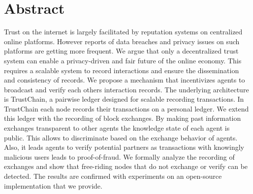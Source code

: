 \chapter*{Abstract}

Trust on the internet is largely facilitated by reputation systems on centralized online platforms. 
However reports of data breaches and privacy issues on such platforms are getting more frequent.
We argue that only a decentralized trust system can enable a privacy-driven and fair 
future of the online economy. This requires a scalable system to record interactions and ensure
the dissemination and consistency of records. We propose a mechanism that incentivizes agents to 
broadcast and verify each others interaction records. The underlying architecture is TrustChain, 
a pairwise ledger designed for scalable recording transactions. In TrustChain each node records 
their transactions on a personal ledger. We extend this ledger with the recording of block 
exchanges. By making past information exchanges transparent to other agents the knowledge state of 
each agent is public. This allows to discriminate based on the exchange behavior of agents. Also, it
leads agents to verify potential partners as transactions with knowingly malicious users leads to 
proof-of-fraud. We formally analyze the recording of exchanges and show that free-riding nodes that do
not exchange or verify can be detected. The results are confirmed with experiments on an open-source 
implementation that we provide.

